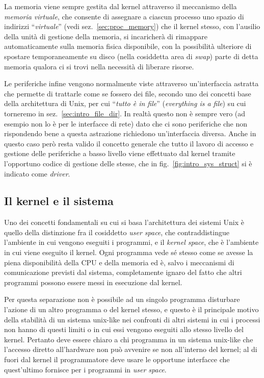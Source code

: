 
La memoria viene sempre gestita dal kernel attraverso il meccanismo della
\textsl{memoria virtuale}, che consente di assegnare a ciascun processo uno
spazio di indirizzi ``\textsl{virtuale}'' (vedi sez.~\ref{sec:proc_memory})
che il kernel stesso, con l'ausilio della unità di gestione della memoria, si
incaricherà di rimappare automaticamente sulla memoria fisica disponibile, con
la possibilità ulteriore di spostare temporaneamente su disco (nella
cosiddetta area di \textit{swap}) parte di detta memoria qualora ci si trovi
nella necessità di liberare risorse.

Le periferiche infine vengono normalmente viste attraverso un'interfaccia
astratta che permette di trattarle come se fossero dei file, secondo uno dei
concetti base della architettura di Unix, per cui ``\textsl{tutto è in file}''
(\textit{everything is a file}) su cui torneremo in
sez.~\ref{sec:intro_file_dir}. In realtà questo non è sempre vero (ad esempio
non lo è per le interfacce di rete) dato che ci sono periferiche che non
rispondendo bene a questa astrazione richiedono un'interfaccia diversa.  Anche
in questo caso però resta valido il concetto generale che tutto il lavoro di
accesso e gestione delle periferiche a basso livello viene effettuato dal
kernel tramite l'opportuno codice di gestione delle stesse, che in
fig.~\ref{fig:intro_sys_struct} si è indicato come \textit{driver}.


\subsection{Il kernel e il sistema}
\label{sec:intro_kern_and_sys}

Uno dei concetti fondamentali su cui si basa l'architettura dei sistemi Unix è
quello della distinzione fra il cosiddetto \textit{user space}, che
contraddistingue l'ambiente in cui vengono eseguiti i programmi, e il
\textit{kernel space}, che è l'ambiente in cui viene eseguito il kernel. Ogni
programma vede sé stesso come se avesse la piena disponibilità della CPU e
della memoria ed è, salvo i meccanismi di comunicazione previsti dal sistema,
completamente ignaro del fatto che altri programmi possono essere messi in
esecuzione dal kernel.

Per questa separazione non è possibile ad un singolo programma disturbare
l'azione di un altro programma o del kernel stesso, e questo è il principale
motivo della stabilità di un sistema unix-like nei confronti di altri sistemi
in cui i processi non hanno di questi limiti o in cui essi vengono eseguiti
allo stesso livello del kernel. Pertanto deve essere chiaro a chi programma in
un sistema unix-like che l'accesso diretto all'hardware non può avvenire se
non all'interno del kernel; al di fuori dal kernel il programmatore deve usare
le opportune interfacce che quest'ultimo fornisce per i programmi in
\textit{user space}.


